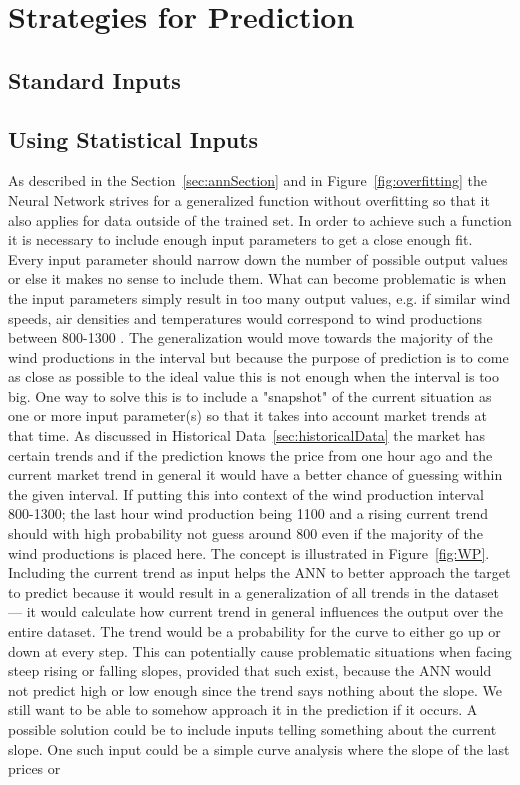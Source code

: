\section{Strategies for Prediction}
\subsection{Standard Inputs}

\subsection{Using Statistical Inputs}
\label{sec:usingStatisticalInput}
As described in the Section~\ref{sec:annSection} and in Figure~\ref{fig:overfitting} the Neural Network strives for a generalized function without overfitting so that it also applies for data outside of the trained set. In order to achieve such a function it is necessary to include enough input parameters to get a close enough fit. Every input parameter should narrow down the number of possible output values or else it makes no sense to include them. What can become problematic is when the input parameters simply result in too many output values, e.g. if similar wind speeds, air densities and temperatures would correspond to wind productions between 800-1300 . The generalization would move towards the majority of the wind productions in the interval but because the purpose of prediction is to come as close as possible to the ideal value this is not enough when the interval is too big. One way to solve this is to include a "snapshot" of the current situation as one or more input parameter(s) so that it takes into account market trends at that time. As discussed in Historical Data~\ref{sec:historicalData} the market has certain trends and if the prediction knows the price from one hour ago and the current market trend in general it would have a better chance of guessing within the given interval. If putting this into context of the wind production interval 800-1300; the last hour wind production being 1100 and a rising current trend should with high probability not guess around 800 even if the majority of the wind productions is placed here. The concept is illustrated in Figure~\ref{fig:WP}. Including the current trend as input helps the ANN to better approach the target to predict because it would result in a generalization of all trends in the dataset --- it would calculate how current trend in general influences the output over the entire dataset. The trend would be a probability for the curve to either go up or down at every step. This can potentially cause problematic situations when facing steep rising or falling slopes, provided that such exist, because the ANN would not predict high or low enough since the trend says nothing about the slope. We still want to be able to somehow approach it in the prediction if it occurs. A possible solution could be to include inputs telling something about the current slope. One such input could be a simple curve analysis where the slope of the last prices or 